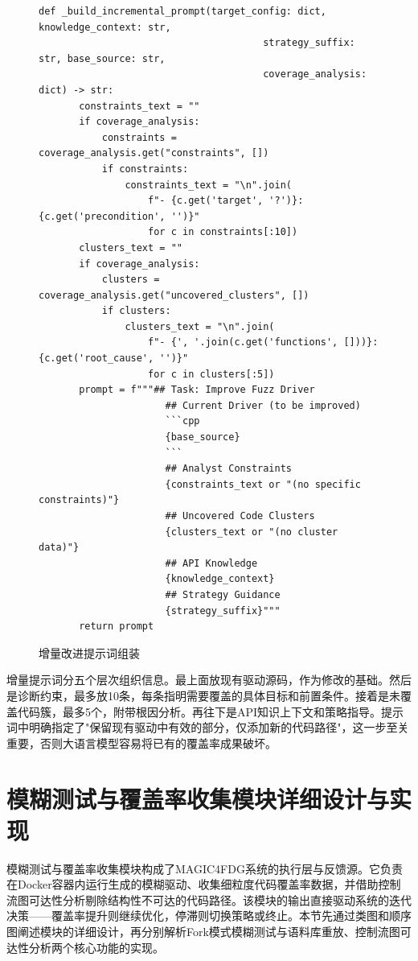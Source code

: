 \begin{figure}[H]
    \centering
    \begin{lstlisting}[style=style@python]
   def _build_incremental_prompt(target_config: dict, knowledge_context: str,
                                       strategy_suffix: str, base_source: str,
                                       coverage_analysis: dict) -> str:
       constraints_text = ""
       if coverage_analysis:
           constraints = coverage_analysis.get("constraints", [])
           if constraints:
               constraints_text = "\n".join(
                   f"- {c.get('target', '?')}: {c.get('precondition', '')}"
                   for c in constraints[:10])
       clusters_text = ""
       if coverage_analysis:
           clusters = coverage_analysis.get("uncovered_clusters", [])
           if clusters:
               clusters_text = "\n".join(
                   f"- {', '.join(c.get('functions', []))}: {c.get('root_cause', '')}"
                   for c in clusters[:5])
       prompt = f"""## Task: Improve Fuzz Driver
                      ## Current Driver (to be improved)
                      ```cpp
                      {base_source}
                      ```
                      ## Analyst Constraints
                      {constraints_text or "(no specific constraints)"}
                      ## Uncovered Code Clusters
                      {clusters_text or "(no cluster data)"}
                      ## API Knowledge
                      {knowledge_context}
                      ## Strategy Guidance
                      {strategy_suffix}"""
       return prompt
    \end{lstlisting}
    \caption{增量改进提示词组装}
    \label{fig:incremental-prompt}
\end{figure}

增量提示词分五个层次组织信息。最上面放现有驱动源码，作为修改的基础。然后是诊断约束，最多放10条，每条指明需要覆盖的具体目标和前置条件。接着是未覆盖代码簇，最多5个，附带根因分析。再往下是API知识上下文和策略指导。提示词中明确指定了"保留现有驱动中有效的部分，仅添加新的代码路径"，这一步至关重要，否则大语言模型容易将已有的覆盖率成果破坏。

\section{模糊测试与覆盖率收集模块详细设计与实现}

模糊测试与覆盖率收集模块构成了MAGIC4FDG系统的执行层与反馈源。它负责在Docker容器内运行生成的模糊驱动、收集细粒度代码覆盖率数据，并借助控制流图可达性分析剔除结构性不可达的代码路径。该模块的输出直接驱动系统的迭代决策——覆盖率提升则继续优化，停滞则切换策略或终止。本节先通过类图和顺序图阐述模块的详细设计，再分别解析Fork模式模糊测试与语料库重放、控制流图可达性分析两个核心功能的实现。

